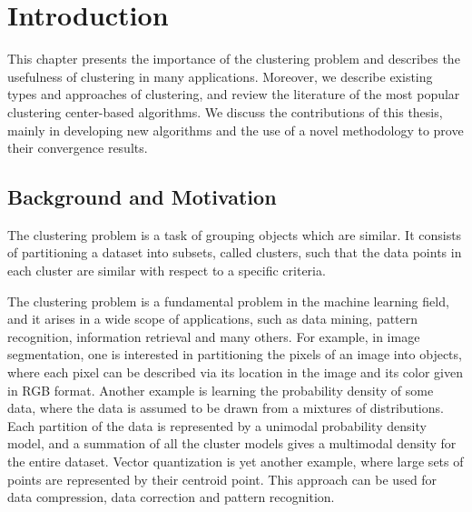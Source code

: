 \chapter{Introduction} \label{intro}

\noindent \noindent \hrulefill

This chapter presents the importance of the clustering problem and describes the usefulness of clustering in many applications. Moreover, we describe existing types and approaches of clustering, and review the literature of the most popular clustering center-based algorithms. We discuss the contributions of this thesis, mainly in developing new algorithms and the use of a novel methodology to prove their convergence results.

\noindent \noindent \hrulefill

\section{Background and Motivation}

The clustering problem is a task of grouping objects which are similar. It consists of partitioning a dataset into subsets, called clusters, such that the data points in each cluster are similar with respect to a specific criteria. \medskip

The clustering problem is a fundamental problem in the machine learning field, and it arises in a wide scope of applications, such as data mining, pattern recognition, information retrieval and many others. For example, in image segmentation, one is interested in partitioning the pixels of an image into objects, where each pixel can be described via its location in the image and its color given in RGB format. Another example is learning the probability density of some data, where the data is assumed to be drawn from a mixtures of distributions. Each partition of the data is represented by a unimodal probability density model, and a summation of all the cluster models gives a multimodal density for the entire dataset. Vector quantization is yet another example, where large sets of points are represented by their centroid point. This approach can be used for data compression, data correction and pattern recognition.\medskip

